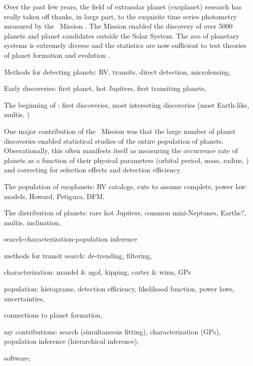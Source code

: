 Over the past few years, the field of extrasolar planet (exoplanet) research
has really taken off thanks, in large part, to the exquisite time series
photometry measured by the \kepler\ Mission .
The Mission enabled the discovery of over 5000  planets and planet
candidates outside the Solar System.
The zoo of planetary systems is extremely diverse and the statistics are now
sufficient to test theories of planet formation and evolution .

{Methods for detecting planets: RV, transits, direct detection,
microlensing, \etc}

{Early discoveries: first planet, hot Jupiters, first transiting
planets, \etc}

{The beginning of \kepler: first discoveries, most interesting
discoveries (most Earth-like, multis, \etc)}

One major contribution of the \kepler\ Mission was that the large number of
planet discoveries enabled statistical studies of the entire population of
planets.
Obserationally, this often manifests itself as measuring the occurrence rate
of planets as a function of their physical parameters (orbital period, mass,
radius, \etc) and correcting for selection effects and detection efficiency.

{The population of exoplanets: RV catalogs, cuts to assume complete,
power law models, Howard, Petigura, DFM, \etc}

{The distribution of planets: rare hot Jupiters, common mini-Neptunes,
Earths?, multis, inclination, \etc}

{search-characterization-population inference}

{methods for transit search: de-trending, filtering, \etc}

{characterization: mandel \& agol, kipping, carter \& winn, GPs}

{population: histograms, detection efficiency, likelihood function,
power laws, uncertainties, \etc}

{connections to planet formation, \etc}

{my contributions: search (simultaneous fitting), characterization
(GPs), population inference (hierarchical inference), \etc}

{software, \etc}

